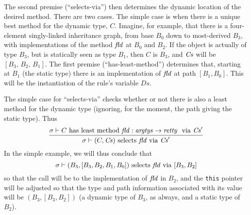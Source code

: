 \documentclass[11pt]{article}
\begin{document}
The second premise (``selects-via'') then determines the dynamic
location of the desired method.  There are two cases.  The simple case
is when there is a unique best method for the dynamic type, $C$.
Imagine, for example, that there is a four-element singly-linked
inheritance graph, from base $B_0$ down to most-derived $B_3$, with
implementations of the method $\mathit{fld}$ at $B_0$ and $B_2$.  If the
object is actually of type $B_3$, but is statically seen as type
$B_1$, then $C$ is $B_3$, and $\mathit{Cs}$ will be $[B_3,\,B_2,\,B_1]$.  The
first premise (``has-least-method'') determines that, starting at
$B_1$ (the static type) there is an implementation of $\mathit{fld}$ at path
$[B_1, B_0]$.  This will be the instantiation of the rule's variable
$Ds$.

The simple case for ``selects-via'' checks whether or not there is
also a least method for the dynamic type (ignoring, for the moment,
the path giving the static type).  Thus
\[
\infer{\sigma \vdash (C,\Cs) \textrm{ selects } \fld \textrm{ via } \Cs'}{\sigma \vdash C \textrm{ has least method } \fld :
  \funtype{\mathit{argtys}}{\mathit{retty}} \ \textrm{ via } \Cs'}
\]
In the simple example, we will thus conclude that \[
\sigma \vdash (B_3,[B_3,B_2,B_1,B_0]) \textrm{ selects } \mathit{fld}
\textrm{ via } [B_3,B_2]
\]
so that the call will be to the implementation of $\mathit{fld}$ in $B_2$, and
the \texttt{this} pointer will be adjusted so that the type and path
information associated with its value will be $(B_3,[B_3,B_2])$ (a
dynamic type of $B_3$, as always, and a static type of $B_2$).
\end{document}
